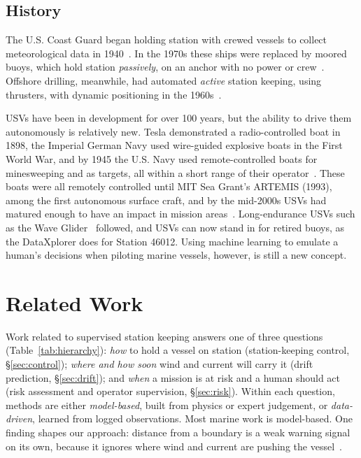 \documentclass[sigconf]{acmart}
\begin{document}
\subsection{History}\label{sec:history}
{The U.S. Coast Guard began holding station with crewed vessels to collect meteorological data in 1940~\cite{dinsmore1996alpha}. In the 1970s these ships were replaced by moored buoys, which hold station \textit{passively}, on an anchor with no power or crew~\cite{dinsmore1996alpha}. Offshore drilling, meanwhile, had automated \textit{active} station keeping, using thrusters, with dynamic positioning in the 1960s~\cite{sorensen2011survey}.}


{USVs have been in development for over 100 years, but the ability to drive them autonomously is relatively new. Tesla demonstrated a radio-controlled boat in 1898, the Imperial German Navy used wire-guided explosive boats in the First World War, and by 1945 the U.S. Navy used remote-controlled boats for minesweeping and as targets, all within a short range of their operator~\cite{everett2015unmanned}. These boats were all remotely controlled until MIT Sea Grant's ARTEMIS (1993), among the first autonomous surface craft, and by the mid-2000s USVs had matured enough to have an impact in mission areas~\cite{manley2008usv}. Long-endurance USVs such as the Wave Glider~\cite{manley2010waveglider} followed, and USVs can now stand in for retired buoys, as the DataXplorer does for Station 46012. Using machine learning to emulate a human's decisions when piloting marine vessels, however, is still a new concept.}

\section{Related Work}
\label{sec:related}
Work related to supervised station keeping answers one of three questions (Table~\ref{tab:hierarchy}): \emph{how} to hold a vessel on station (station-keeping control, \S\ref{sec:control}); \emph{where and how soon} wind and current will carry it (drift prediction, \S\ref{sec:drift}); and \emph{when} a mission is at risk and a human should act (risk assessment and operator supervision, \S\ref{sec:risk}). Within each question, methods are either \emph{model-based}, built from physics or expert judgement, or \emph{data-driven}, learned from logged observations. Most marine work is model-based. One finding shapes our approach: distance from a boundary is a weak warning signal on its own, because it ignores where wind and current are pushing the vessel~\cite{dugan2024drifting}.
\end{document}
